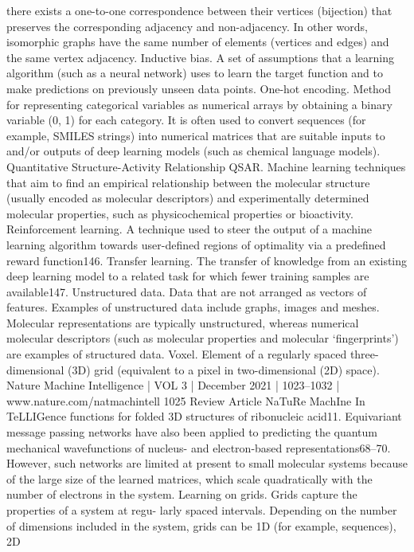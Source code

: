 there exists a one-to-one correspondence between their vertices
(bijection) that preserves the corresponding adjacency and
non-adjacency. In other words, isomorphic graphs have the same
number of elements (vertices and edges) and the same vertex
adjacency.
Inductive bias. A set of assumptions that a learning algorithm
(such as a neural network) uses to learn the target function and to
make predictions on previously unseen data points.
One-hot encoding. Method for representing categorical variables
as numerical arrays by obtaining a binary variable (0, 1) for each
category. It is often used to convert sequences (for example,
SMILES strings) into numerical matrices that are suitable inputs
to and/or outputs of deep learning models (such as chemical
language models).
Quantitative Structure-Activity Relationship QSAR. Machine
learning techniques that aim to find an empirical relationship
between the molecular structure (usually encoded as molecular
descriptors) and experimentally determined molecular properties,
such as physicochemical properties or bioactivity.
Reinforcement learning. A technique used to steer the output
of a machine learning algorithm towards user-defined regions of
optimality via a predefined reward function146.
Transfer learning. The transfer of knowledge from an existing
deep learning model to a related task for which fewer training
samples are available147.
Unstructured data. Data that are not arranged as vectors of
features. Examples of unstructured data include graphs, images
and meshes. Molecular representations are typically unstructured,
whereas numerical molecular descriptors (such as molecular
properties and molecular ‘fingerprints’) are examples of structured
data.
Voxel. Element of a regularly spaced three-dimensional (3D) grid
(equivalent to a pixel in two-dimensional (2D) space).
Nature Machine Intelligence | VOL 3 | December 2021 | 1023–1032 | www.nature.com/natmachintell
1025
Review Article
NaTuRe MachIne In TeLLIGence
functions for folded 3D structures of ribonucleic acid11. Equivariant
message passing networks have also been applied to predicting the
quantum mechanical wavefunctions of nucleus- and electron-based
representations68–70. However, such networks are limited at present
to small molecular systems because of the large size of the learned
matrices, which scale quadratically with the number of electrons in
the system.
Learning on grids. Grids capture the properties of a system at regu-
larly spaced intervals. Depending on the number of dimensions
included in the system, grids can be 1D (for example, sequences), 2D
